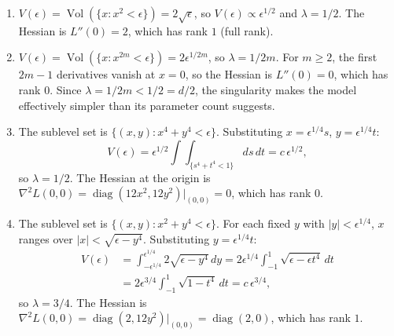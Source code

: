 \documentclass[11pt]{article}
\begin{document}
\begin{solution}
\begin{enumerate}
    \item
        $V(\epsilon) = \operatorname{Vol}(\{x : x^2 < \epsilon\}) = 2\sqrt{\epsilon}$, so $V(\epsilon) \propto \epsilon^{1/2}$ and $\lambda = 1/2$. The Hessian is $L''(0) = 2$, which has rank $1$ (full rank).
    \item
        $V(\epsilon) = \operatorname{Vol}(\{x : x^{2m} < \epsilon\}) = 2\epsilon^{1/2m}$, so $\lambda = 1/2m$. For $m \geq 2$, the first $2m - 1$ derivatives vanish at $x = 0$, so the Hessian is $L''(0) = 0$, which has rank $0$. Since $\lambda = 1/2m < 1/2 = d/2$, the singularity makes the model effectively simpler than its parameter count suggests.
    \item
        The sublevel set is $\{(x,y) : x^4 + y^4 < \epsilon\}$. Substituting $x = \epsilon^{1/4}s$, $y = \epsilon^{1/4}t$:
        \[
            V(\epsilon) = \epsilon^{1/2} \int\!\!\int_{\{s^4 + t^4 < 1\}} ds\, dt = c\,\epsilon^{1/2},
        \]
        so $\lambda = 1/2$. The Hessian at the origin is $\nabla^2L(0,0) = \operatorname{diag}(12x^2, 12y^2)\big|_{(0,0)} = 0$, which has rank $0$.
    \item
        The sublevel set is $\{(x,y) : x^2 + y^4 < \epsilon\}$. For each fixed $y$ with $|y| < \epsilon^{1/4}$, $x$ ranges over $|x| < \sqrt{\epsilon - y^4}$. Substituting $y = \epsilon^{1/4}t$:
        \begin{align*}
            V(\epsilon) &= \int_{-\epsilon^{1/4}}^{\epsilon^{1/4}} 2\sqrt{\epsilon - y^4}\, dy = 2\epsilon^{1/4} \int_{-1}^{1} \sqrt{\epsilon - \epsilon t^4}\, dt \\
            &= 2\epsilon^{3/4} \int_{-1}^{1} \sqrt{1 - t^4}\, dt = c\,\epsilon^{3/4},
        \end{align*}
        so $\lambda = 3/4$. The Hessian is $\nabla^2L(0,0) = \operatorname{diag}(2, 12y^2)\big|_{(0,0)} = \operatorname{diag}(2, 0)$, which has rank $1$.
\end{enumerate}
\end{solution}
\end{document}
